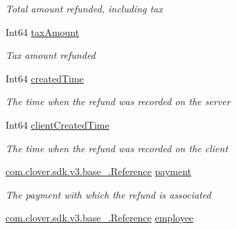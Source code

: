 \begin{DoxyCompactItemize}
\begin{DoxyCompactList}\small\item\em Total amount refunded, including tax \end{DoxyCompactList}\item 
Int64 \hyperlink{classcom_1_1clover_1_1sdk_1_1v3_1_1payments_1_1_refund_a7c8a0b3ac90acd6707b4a6e1bd455488}{tax\+Amount}
\begin{DoxyCompactList}\small\item\em Tax amount refunded \end{DoxyCompactList}\item 
Int64 \hyperlink{classcom_1_1clover_1_1sdk_1_1v3_1_1payments_1_1_refund_ae878b786bc60ae272cc0fe8b71f34929}{created\+Time}
\begin{DoxyCompactList}\small\item\em The time when the refund was recorded on the server \end{DoxyCompactList}\item 
Int64 \hyperlink{classcom_1_1clover_1_1sdk_1_1v3_1_1payments_1_1_refund_af1784c72040d7785847b2f170661e5a5}{client\+Created\+Time}
\begin{DoxyCompactList}\small\item\em The time when the refund was recorded on the client \end{DoxyCompactList}\item 
\hyperlink{classcom_1_1clover_1_1sdk_1_1v3_1_1base___1_1_reference}{com.\+clover.\+sdk.\+v3.\+base\+\_\+.\+Reference} \hyperlink{classcom_1_1clover_1_1sdk_1_1v3_1_1payments_1_1_refund_a4adaa81a745b0cbfd7ed26d62f4cae13}{payment}
\begin{DoxyCompactList}\small\item\em The payment with which the refund is associated \end{DoxyCompactList}\item 
\hyperlink{classcom_1_1clover_1_1sdk_1_1v3_1_1base___1_1_reference}{com.\+clover.\+sdk.\+v3.\+base\+\_\+.\+Reference} \hyperlink{classcom_1_1clover_1_1sdk_1_1v3_1_1payments_1_1_refund_aabe33b851988730312b3f9468c1817f8}{employee}

\end{DoxyCompactItemize}
